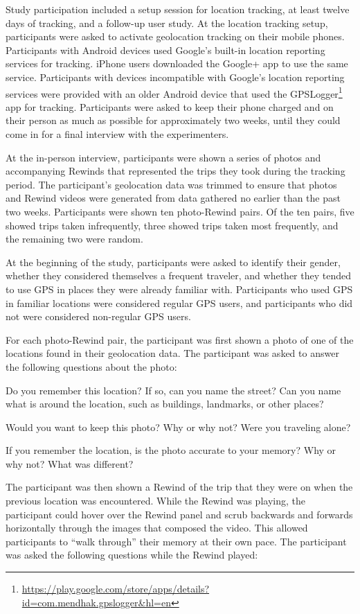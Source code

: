 \documentclass{sigchi}
\begin{document}
Study participation included a setup session for location tracking, at least twelve days of tracking, and a follow-up user study. At the location tracking setup, participants were asked to activate geolocation tracking on their mobile phones. Participants with Android devices used Google's built-in location reporting services for tracking. iPhone users downloaded the Google+ app to use the same service. Participants with devices incompatible with Google's location reporting services were provided with an older Android device that used the GPSLogger\footnote{\url{https://play.google.com/store/apps/details?id=com.mendhak.gpslogger&hl=en}} app for tracking. Participants were asked to keep their phone charged and on their person as much as possible for approximately two weeks, until they could come in for a final interview with the experimenters.

At the in-person interview, participants were shown a series of photos and accompanying Rewinds that represented the trips they took during the tracking period. The participant's geolocation data was trimmed to ensure that photos and Rewind videos were generated from data gathered no earlier than the past two weeks. Participants were shown ten photo-Rewind pairs.  Of the ten pairs, five showed trips taken infrequently, three showed trips taken most frequently, and the remaining two were random. 

At the beginning of the study, participants were asked to identify their gender, whether they considered themselves a frequent traveler, and whether they tended to use GPS in places they were already familiar with. Participants who used GPS in familiar locations were considered regular GPS users, and participants who did not were considered non-regular GPS users.

For each photo-Rewind pair, the participant was first shown a photo of one of the locations found in their geolocation data. The participant was asked to answer the following questions about the photo:

Do you remember this location? If so, can you name the street? Can you name what is around the location, such as buildings, landmarks, or other places?

Would you want to keep this photo? Why or why not? Were you traveling alone?

If you remember the location, is the photo accurate to your memory? Why or why not? What was different?

The participant was then shown a Rewind of the trip that they were on when the previous location was encountered. While the Rewind was playing, the participant could hover over the Rewind panel and scrub backwards and forwards horizontally through the images that composed the video. This allowed participants to ``walk through'' their memory at their own pace. The participant was asked the following questions while the Rewind played:
\end{document}
